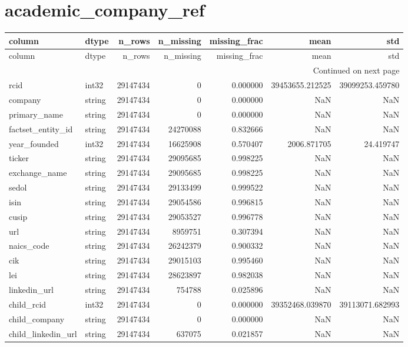 \documentclass{article}
\begin{document}
\section*{academic_company_ref}
\begin{longtable}{llrrrrr}
\toprule
column & dtype & n_rows & n_missing & missing_frac & mean & std \\
\midrule
\endfirsthead
\toprule
column & dtype & n_rows & n_missing & missing_frac & mean & std \\
\midrule
\endhead
\midrule
\multicolumn{7}{r}{Continued on next page} \\
\midrule
\endfoot
\bottomrule
\endlastfoot
rcid & int32 & 29147434 & 0 & 0.000000 & 39453655.212525 & 39099253.459780 \\
company & string & 29147434 & 0 & 0.000000 & NaN & NaN \\
primary_name & string & 29147434 & 0 & 0.000000 & NaN & NaN \\
factset_entity_id & string & 29147434 & 24270088 & 0.832666 & NaN & NaN \\
year_founded & int32 & 29147434 & 16625908 & 0.570407 & 2006.871705 & 24.419747 \\
ticker & string & 29147434 & 29095685 & 0.998225 & NaN & NaN \\
exchange_name & string & 29147434 & 29095685 & 0.998225 & NaN & NaN \\
sedol & string & 29147434 & 29133499 & 0.999522 & NaN & NaN \\
isin & string & 29147434 & 29054586 & 0.996815 & NaN & NaN \\
cusip & string & 29147434 & 29053527 & 0.996778 & NaN & NaN \\
url & string & 29147434 & 8959751 & 0.307394 & NaN & NaN \\
naics_code & string & 29147434 & 26242379 & 0.900332 & NaN & NaN \\
cik & string & 29147434 & 29015103 & 0.995460 & NaN & NaN \\
lei & string & 29147434 & 28623897 & 0.982038 & NaN & NaN \\
linkedin_url & string & 29147434 & 754788 & 0.025896 & NaN & NaN \\
child_rcid & int32 & 29147434 & 0 & 0.000000 & 39352468.039870 & 39113071.682993 \\
child_company & string & 29147434 & 0 & 0.000000 & NaN & NaN \\
child_linkedin_url & string & 29147434 & 637075 & 0.021857 & NaN & NaN \\

\end{longtable}
\end{document}
